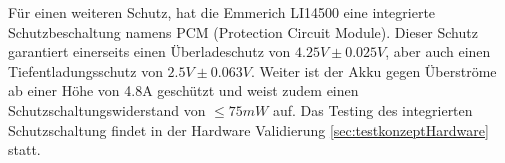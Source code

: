 Für einen weiteren Schutz, hat die Emmerich LI14500 eine integrierte Schutzbeschaltung namens PCM (Protection Circuit Module). Dieser Schutz garantiert einerseits einen Überladeschutz von $4.25V\pm 0.025V$, aber auch einen Tiefentladungsschutz von $2.5V\pm 0.063V$. Weiter ist der Akku gegen Überströme ab einer Höhe von 4.8A geschützt und weist zudem einen Schutzschaltungswiderstand von $\leq 75mW$ auf. Das Testing des integrierten Schutzschaltung findet in der Hardware Validierung \ref{sec:testkonzeptHardware} statt.


